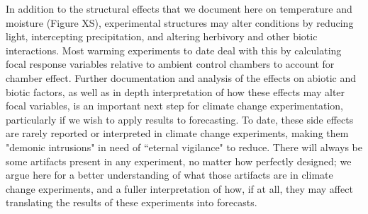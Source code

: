 \documentclass{article}
\begin{document}
\par In addition to the structural effects that we document here on temperature and moisture (Figure XS), experimental structures may alter conditions by reducing light, intercepting precipitation, and altering herbivory and other biotic interactions\citep{kennedy1995,wolkovich2012}. Most warming experiments to date deal with this by calculating focal response variables relative to ambient control chambers to account for chamber effect\citep [e.g.][]{marchin2015}. Further documentation and analysis of the effects on abiotic and biotic factors, as well as in depth interpretation of how these effects may alter focal variables, is an important next step for climate change experimentation, particularly if we wish to apply results to forecasting. To date, these side effects are rarely reported or interpreted in climate change experiments, making them "demonic intrusions" in need of “eternal vigilance" to reduce\citep{hurlbert1984}. There will always be some artifacts present in any experiment, no matter how perfectly designed; we argue here for a better understanding of what those artifacts are in climate change experiments, and a fuller interpretation of how, if at all, they may affect translating the results of these experiments into forecasts. 
\end{document}
